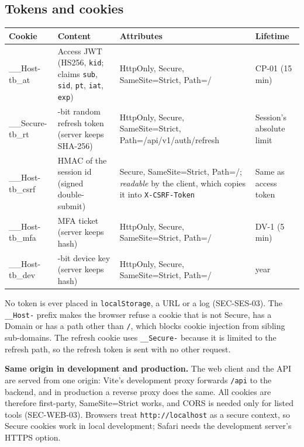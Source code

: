 \documentclass[11pt,a4paper]{article}
\newenvironment{dtable}[1]{\small\begin{longtable}{#1}}{\end{longtable}}
\begin{document}
\subsection{Tokens and cookies}
\begin{dtable}{@{}>{\ttfamily\raggedright\arraybackslash}p{2.7cm}>{\raggedright\arraybackslash}p{4.2cm}>{\raggedright\arraybackslash}p{4.8cm}>{\raggedright\arraybackslash}p{3.4cm}@{}}
\toprule
\textnormal{\textbf{Cookie}} & \textbf{Content} & \textbf{Attributes} & \textbf{Lifetime} \\ \midrule \endhead
\_\_Host-tb\_at & Access JWT (HS256, \texttt{kid}; claims \texttt{sub}, \texttt{sid}, \texttt{pt}, \texttt{iat}, \texttt{exp}) & HttpOnly, Secure, SameSite=Strict, Path=/ & CP-01 (15 min) \\
\_\_Secure-tb\_rt & 256-bit random refresh token (server keeps SHA-256) & HttpOnly, Secure, SameSite=Strict, Path=/api/v1/auth/refresh & Session's absolute limit \\
\_\_Host-tb\_csrf & HMAC of the session id (signed double-submit) & Secure, SameSite=Strict, Path=/; \emph{readable} by the client, which copies it into \texttt{X-CSRF-Token} & Same as access token \\
\_\_Host-tb\_mfa & MFA ticket (server keeps hash) & HttpOnly, Secure, SameSite=Strict, Path=/ & DV-1 (5 min) \\
\_\_Host-tb\_dev & 256-bit device key (server keeps hash) & HttpOnly, Secure, SameSite=Strict, Path=/ & 1 year \\
\bottomrule
\end{dtable}
No token is ever placed in \texttt{localStorage}, a URL or a log (SEC-SES-03). The \texttt{\_\_Host-} prefix makes the browser refuse a cookie that is not Secure, has a Domain or has a path other than \texttt{/}, which blocks cookie injection from sibling sub-domains. The refresh cookie uses \texttt{\_\_Secure-} because it is limited to the refresh path, so the refresh token is sent with no other request.

\textbf{Same origin in development and production.} The web client and the API are served from one origin: Vite's development proxy forwards \texttt{/api} to the backend, and in production a reverse proxy does the same. All cookies are therefore first-party, SameSite=Strict works, and CORS is needed only for listed tools (SEC-WEB-03). Browsers treat \texttt{http://localhost} as a secure context, so Secure cookies work in local development; Safari needs the development server's HTTPS option.
\end{document}
